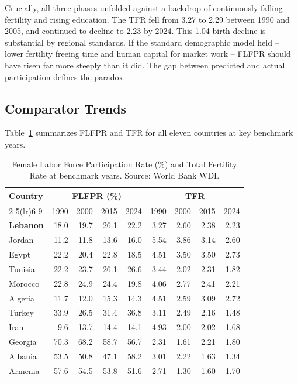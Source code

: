 \documentclass[12pt,a4paper]{article}
\begin{document}
Crucially, all three phases unfolded against a backdrop of continuously falling fertility and rising education. The TFR fell from 3.27 to 2.29 between 1990 and 2005, and continued to decline to 2.23 by 2024. This 1.04-birth decline is substantial by regional standards. If the standard demographic model held -- lower fertility freeing time and human capital for market work -- FLFPR should have risen far more steeply than it did. The gap between predicted and actual participation defines the paradox.

\subsection{Comparator Trends}

Table~\ref{tab:flfpr_trends} summarizes FLFPR and TFR for all eleven countries at key benchmark years.

\begin{table}[H]
\centering
\caption{Female Labor Force Participation Rate (\%) and Total Fertility Rate at benchmark years. Source: World Bank WDI.}
\label{tab:flfpr_trends}
\small
\begin{tabular}{lrrrrrrrr}
\toprule
\multirow{2}{*}{\textbf{Country}} & \multicolumn{4}{c}{\textbf{FLFPR (\%)}} & \multicolumn{4}{c}{\textbf{TFR}} \\
\cmidrule(lr){2-5}\cmidrule(lr){6-9}
 & 1990 & 2000 & 2015 & 2024 & 1990 & 2000 & 2015 & 2024 \\
\midrule
\textbf{Lebanon}  & 18.0 & 19.7 & 26.1 & 22.2 & 3.27 & 2.60 & 2.38 & 2.23 \\
\midrule
Jordan   & 11.2 & 11.8 & 13.6 & 16.0 & 5.54 & 3.86 & 3.14 & 2.60 \\
Egypt    & 22.2 & 20.4 & 22.8 & 18.5 & 4.51 & 3.50 & 3.50 & 2.73 \\
Tunisia  & 22.2 & 23.7 & 26.1 & 26.6 & 3.44 & 2.02 & 2.31 & 1.82 \\
Morocco  & 22.8 & 24.9 & 24.4 & 19.8 & 4.06 & 2.77 & 2.41 & 2.21 \\
Algeria  & 11.7 & 12.0 & 15.3 & 14.3 & 4.51 & 2.59 & 3.09 & 2.72 \\
\midrule
Turkey   & 33.9 & 26.5 & 31.4 & 36.8 & 3.11 & 2.49 & 2.16 & 1.48 \\
Iran     &  9.6 & 13.7 & 14.4 & 14.1 & 4.93 & 2.00 & 2.02 & 1.68 \\
Georgia  & 70.3 & 68.2 & 58.7 & 56.7 & 2.31 & 1.61 & 2.21 & 1.80 \\
Albania  & 53.5 & 50.8 & 47.1 & 58.2 & 3.01 & 2.22 & 1.63 & 1.34 \\
Armenia  & 57.6 & 54.5 & 53.8 & 51.6 & 2.71 & 1.30 & 1.60 & 1.70 \\
\bottomrule
\end{tabular}
\end{table}
\end{document}
